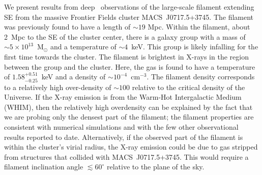 We present results from deep \chandra\ observations of the large-scale filament extending SE from the massive Frontier Fields cluster MACS~J0717.5+3745. The filament was previously found to have a length of $\sim 19$ Mpc. Within the filament, about 2~Mpc to the SE of the cluster center, there is a galaxy group with a mass of $\sim 5\times 10^{13}$~M$_\odot$ and a temperature of $\sim 4$~keV. This group is likely infalling for the first time towards the cluster. The filament is brightest in X-rays in the region between the group and the cluster. Here, the gas is found to have a temperature of $1.58_{-0.25}^{+0.51}$~keV and a density of $\sim 10^{-4}$~cm$^{-3}$. The filament density corresponds to a relatively high over-density of $\sim 100$ relative to the critical density of the Universe. If the X-ray emission is from the Warm-Hot Intergalactic Medium (WHIM), then the relatively high overdensity can be explained by the fact that we are probing only the densest part of the filament; the filament properties are consistent with numerical simulations and with the few other observational results reported to date. Alternatively, if the observed part of the filament is within the cluster's virial radius, the X-ray emission could be due to gas stripped from structures that collided with MACS~J0717.5+3745. This would require a filament inclination angle $\lesssim 60^\circ$ relative to the plane of the sky.
